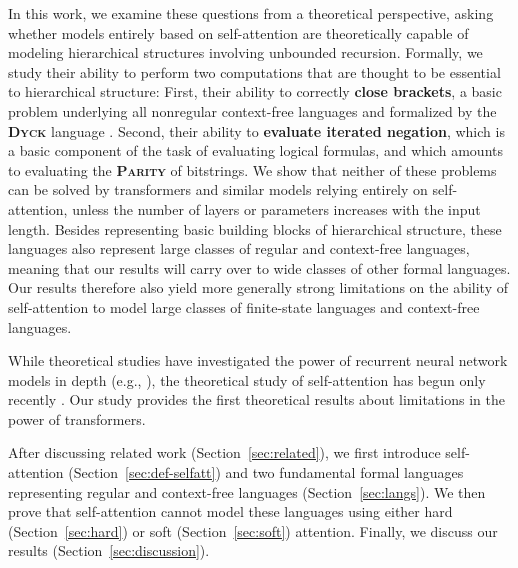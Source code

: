 \documentclass[11pt,a4paper]{article}
\newcommand{\key}[1]{\textbf{#1}}
\begin{document}
In this work, we examine these questions from a theoretical perspective, asking whether models entirely based on self-attention are theoretically capable of modeling hierarchical structures involving unbounded recursion.
Formally, we study their ability to perform two computations that are thought to be essential to hierarchical structure:
First, their ability to correctly \key{close brackets}, a basic problem underlying all nonregular context-free languages and formalized by the \key{\textsc{Dyck}} language \cite{chomsky1963algebraic}.
Second, their ability to \key{evaluate iterated negation}, which is a basic component of the task of evaluating logical formulas, and which amounts to evaluating the \key{\textsc{Parity}} of bitstrings.
We show that neither of these problems can be solved by transformers and similar models relying entirely on self-attention, unless the number of layers or parameters increases with the input length.
Besides representing basic building blocks of hierarchical structure, these languages also represent large classes of regular and context-free languages, meaning that our results will carry over to wide classes of other formal languages.
Our results therefore also yield more generally strong limitations on the ability of self-attention to model large classes of finite-state languages and context-free languages.

While theoretical studies have investigated the power of recurrent neural network models in depth (e.g., \citet{siegelman1991neural, bengio1994learning, weiss2018practical, miller2018recurrent, merrill2019sequential,korsky2019computational}), the theoretical study of self-attention has begun only recently \citep{perez2019turing}.
Our study provides the first theoretical results about limitations in the power of transformers.

After discussing related work (Section~\ref{sec:related}), we first introduce self-attention (Section~\ref{sec:def-selfatt}) and two fundamental formal languages representing regular and context-free languages (Section~\ref{sec:langs}).
We then prove that self-attention cannot model these languages using either hard (Section~\ref{sec:hard}) or soft (Section~\ref{sec:soft}) attention.
Finally, we discuss our results (Section~\ref{sec:discussion}).
\end{document}
